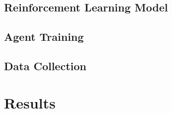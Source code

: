 \documentclass[12pt]{article}
\begin{document}
\subsection{Reinforcement Learning Model}

\subsection{Agent Training}

\subsection{Data Collection}


%
%
%
%
%


\section{Results}
\end{document}

